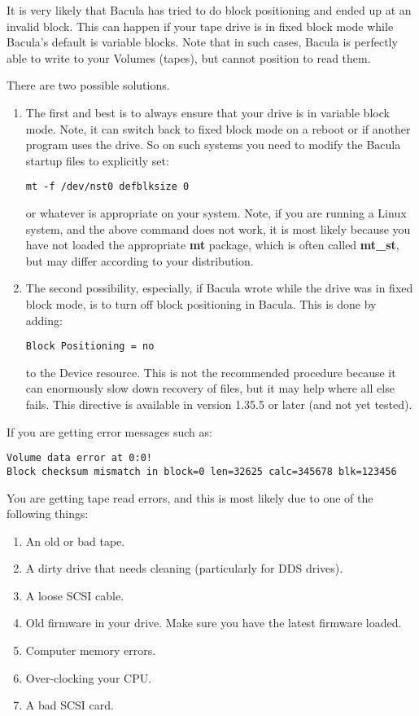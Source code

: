 It is very likely that Bacula has tried to do block positioning and ended up
at an invalid block. This can happen if your tape drive is in fixed block mode
while Bacula's default is variable blocks. Note that in such cases, Bacula is
perfectly able to write to your Volumes (tapes), but cannot position to read
them.

There are two possible solutions.

\begin{enumerate}
\item The first and  best is to always ensure that your drive is in  variable
   block mode. Note, it can switch back to  fixed block mode on a reboot or if
   another program  uses the drive. So on such systems you  need to modify the
   Bacula startup files  to explicitly set:

\footnotesize
\begin{verbatim}
mt -f /dev/nst0 defblksize 0
\end{verbatim}
\normalsize

or whatever is appropriate on your system. Note, if you are running a Linux
system, and the above command does not work, it is most likely because you
have not loaded the appropriate {\bf mt} package, which is often called
{\bf mt\_st}, but may differ according to your distribution.

\item The second possibility, especially, if Bacula wrote  while the drive was
   in fixed block mode, is to turn  off block positioning in Bacula. This is done
   by  adding:

\footnotesize
\begin{verbatim}
Block Positioning = no
\end{verbatim}
\normalsize

to the Device resource. This is not the recommended  procedure because it can
enormously slow down  recovery of files, but it may help where all else
fails. This directive is available in version 1.35.5  or later (and not yet
tested).
\end{enumerate}

If you are getting error messages such as:
\footnotesize
\begin{verbatim}
Volume data error at 0:0!
Block checksum mismatch in block=0 len=32625 calc=345678 blk=123456
\end{verbatim}
\normalsize

You are getting tape read errors, and this is most likely due to
one of the following things:
\begin{enumerate}
\item An old or bad tape.
\item A dirty drive that needs cleaning (particularly for DDS drives).
\item A loose SCSI cable.
\item Old firmware in your drive. Make sure you have the latest firmware
      loaded.
\item Computer memory errors.
\item Over-clocking your CPU.
\item A bad SCSI card.
\end{enumerate}


